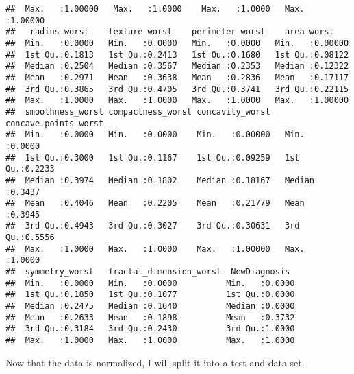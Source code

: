 \documentclass[
]{article}
\newenvironment{Shaded}{\begin{snugshade}}{\end{snugshade}}
\newcommand{\AttributeTok}[1]{\textcolor[rgb]{0.77,0.63,0.00}{#1}}
\newcommand{\ConstantTok}[1]{\textcolor[rgb]{0.00,0.00,0.00}{#1}}
\newcommand{\DecValTok}[1]{\textcolor[rgb]{0.00,0.00,0.81}{#1}}
\newcommand{\FloatTok}[1]{\textcolor[rgb]{0.00,0.00,0.81}{#1}}
\newcommand{\FunctionTok}[1]{\textcolor[rgb]{0.00,0.00,0.00}{#1}}
\newcommand{\NormalTok}[1]{#1}
\newcommand{\OtherTok}[1]{\textcolor[rgb]{0.56,0.35,0.01}{#1}}
\newcommand{\SpecialCharTok}[1]{\textcolor[rgb]{0.00,0.00,0.00}{#1}}
\begin{document}
\begin{verbatim}
##  Max.   :1.00000   Max.   :1.0000    Max.   :1.0000   Max.   :1.00000     
##   radius_worst    texture_worst    perimeter_worst    area_worst     
##  Min.   :0.0000   Min.   :0.0000   Min.   :0.0000   Min.   :0.00000  
##  1st Qu.:0.1813   1st Qu.:0.2413   1st Qu.:0.1680   1st Qu.:0.08122  
##  Median :0.2504   Median :0.3567   Median :0.2353   Median :0.12322  
##  Mean   :0.2971   Mean   :0.3638   Mean   :0.2836   Mean   :0.17117  
##  3rd Qu.:0.3865   3rd Qu.:0.4705   3rd Qu.:0.3741   3rd Qu.:0.22115  
##  Max.   :1.0000   Max.   :1.0000   Max.   :1.0000   Max.   :1.00000  
##  smoothness_worst compactness_worst concavity_worst   concave.points_worst
##  Min.   :0.0000   Min.   :0.0000    Min.   :0.00000   Min.   :0.0000      
##  1st Qu.:0.3000   1st Qu.:0.1167    1st Qu.:0.09259   1st Qu.:0.2233      
##  Median :0.3974   Median :0.1802    Median :0.18167   Median :0.3437      
##  Mean   :0.4046   Mean   :0.2205    Mean   :0.21779   Mean   :0.3945      
##  3rd Qu.:0.4943   3rd Qu.:0.3027    3rd Qu.:0.30631   3rd Qu.:0.5556      
##  Max.   :1.0000   Max.   :1.0000    Max.   :1.00000   Max.   :1.0000      
##  symmetry_worst   fractal_dimension_worst  NewDiagnosis   
##  Min.   :0.0000   Min.   :0.0000          Min.   :0.0000  
##  1st Qu.:0.1850   1st Qu.:0.1077          1st Qu.:0.0000  
##  Median :0.2475   Median :0.1640          Median :0.0000  
##  Mean   :0.2633   Mean   :0.1898          Mean   :0.3732  
##  3rd Qu.:0.3184   3rd Qu.:0.2430          3rd Qu.:1.0000  
##  Max.   :1.0000   Max.   :1.0000          Max.   :1.0000
\end{verbatim}

Now that the data is normalized, I will split it into a test and data
set.

\begin{Shaded}
\end{Shaded}
\end{document}
